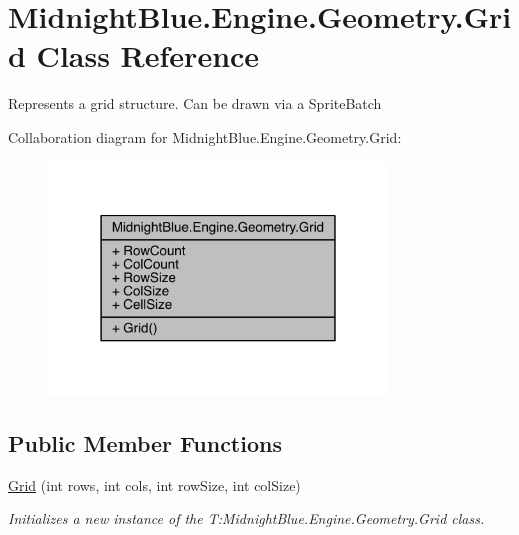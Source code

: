 \hypertarget{class_midnight_blue_1_1_engine_1_1_geometry_1_1_grid}{}\section{Midnight\+Blue.\+Engine.\+Geometry.\+Grid Class Reference}
\label{class_midnight_blue_1_1_engine_1_1_geometry_1_1_grid}


Represents a grid structure. Can be drawn via a Sprite\+Batch  




Collaboration diagram for Midnight\+Blue.\+Engine.\+Geometry.\+Grid\+:
\nopagebreak
\begin{figure}[H]
\begin{center}
\leavevmode
\includegraphics[width=255pt]{class_midnight_blue_1_1_engine_1_1_geometry_1_1_grid__coll__graph}
\end{center}
\end{figure}
\subsection*{Public Member Functions}
\begin{DoxyCompactItemize}
\item 
\hyperlink{class_midnight_blue_1_1_engine_1_1_geometry_1_1_grid_a1b5ded7f24aca80466aac582ad4013bd}{Grid} (int rows, int cols, int row\+Size, int col\+Size)
\begin{DoxyCompactList}\small\item\em Initializes a new instance of the T\+:\+Midnight\+Blue.\+Engine.\+Geometry.\+Grid class. \end{DoxyCompactList}\end{DoxyCompactItemize}
